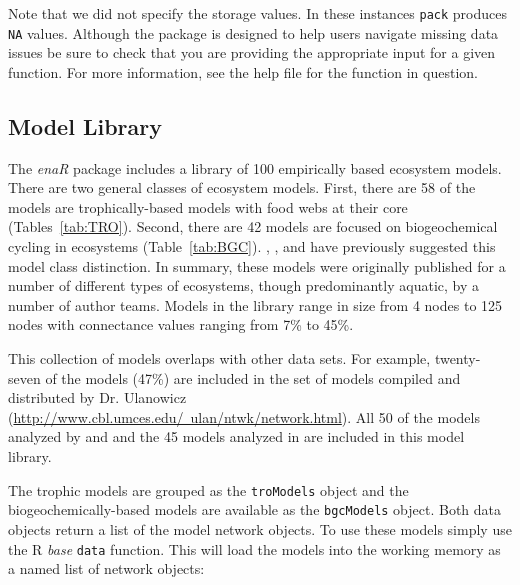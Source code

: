 \documentclass[article]{jss}
\begin{document}
Note that we did not specify the storage values. In these instances
\texttt{pack} produces \texttt{NA} values. Although the package is
designed to help users navigate missing data issues be sure to check
that you are providing the appropriate input for a given function. For
more information, see the help file for the function in question.


\subsection{Model Library}

The \textit{enaR} package includes a library of 100 empirically based
ecosystem models. There are two general classes of ecosystem models.
First, there are 58 of the models are trophically-based models with
food webs at their core (Tables~\ref{tab:TRO}).  Second, there are 42
models are focused on biogeochemical cycling in ecosystems
(Table~\ref{tab:BGC}).  \citet{christian96}, \citet{baird08_sylt}, and
\citet{borrett10_idd} have previously suggested this model class
distinction.  In summary, these models were originally published for a
number of different types of ecosystems, though predominantly aquatic,
by a number of author teams.  Models in the library range in size from
4 nodes to 125 nodes with connectance values ranging from 7\% to 45\%.

This collection of models overlaps with other data sets.  For example,
twenty-seven of the models (47\%) are included in the set of models
compiled and distributed by Dr. Ulanowicz
(\href{http://www.cbl.umces.edu/~ulan/ntwk/network.html}{http://www.cbl.umces.edu/~ulan/ntwk/network.html}).
All 50 of the models analyzed by \citet{borrett10_hmg} and
\citet{salas11_did} and the 45 models analyzed in \citet{borrett13}
are included in this model library.

The trophic models are grouped as the \texttt{troModels} object and
the biogeochemically-based models are available as the
\texttt{bgcModels} object.  Both data objects return a list of the
model network objects.  To use these models simply use the R
\textit{base} \texttt{data} function. This will load the models into
the working memory as a named list of network objects:
\end{document}
